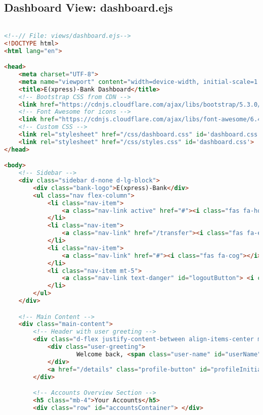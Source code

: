 \subsection{Dashboard View: dashboard.ejs}
\begin{lstlisting}[language=HTML]

<!--// File: views/dashboard.ejs-->
<!DOCTYPE html>
<html lang="en">

<head>
    <meta charset="UTF-8">
    <meta name="viewport" content="width=device-width, initial-scale=1.0">
    <title>E(xpress)-Bank Dashboard</title>
    <!-- Bootstrap CSS from CDN -->
    <link href="https://cdnjs.cloudflare.com/ajax/libs/bootstrap/5.3.0/css/bootstrap.min.css" rel="stylesheet">
    <!-- Font Awesome for icons -->
    <link href="https://cdnjs.cloudflare.com/ajax/libs/font-awesome/6.4.0/css/all.min.css" rel="stylesheet">
    <!-- Custom CSS -->
    <link rel="stylesheet" href="/css/dashboard.css" id='dashboard.css'>
    <link rel="stylesheet" href="/css/styles.css" id='dashboard.css'>
</head>

<body>
    <!-- Sidebar -->
    <div class="sidebar d-none d-lg-block">
        <div class="bank-logo">E(xpress)-Bank</div>
        <ul class="nav flex-column">
            <li class="nav-item">
                <a class="nav-link active" href="#"><i class="fas fa-home"></i> Dashboard</a>
            </li>
            <li class="nav-item">
                <a class="nav-link" href="/transfer"><i class="fas fa-exchange-alt"></i> Transfers</a>
            </li>
            <li class="nav-item">
                <a class="nav-link" href="#"><i class="fas fa-cog"></i> Settings</a>
            </li>
            <li class="nav-item mt-5">
                <a class="nav-link text-danger" id="logoutButton"> <i class="fas fa-sign-out-alt" onclick="logout()"></i> Logout</a>
            </li>
        </ul>
    </div>

    <!-- Main Content -->
    <div class="main-content">
        <!-- Header with user greeting -->
        <div class="d-flex justify-content-between align-items-center mb-4">
            <div class="user-greeting">
                    Welcome back, <span class="user-name" id="userName"><%- user %></span>!
            </div>
            <a href="/details" class="profile-button" id="profileInitials">U</a>
        </div>

        <!-- Accounts Overview Section -->
        <h5 class="mb-4">Your Accounts</h5>
        <div class="row" id="accountsContainer"> </div>


\end{lstlisting}
